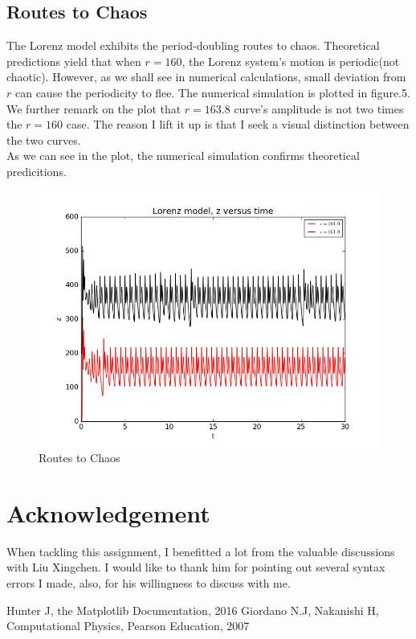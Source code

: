 \documentclass[10pt,a4paper]{article}
\begin{document}
    \subsection{Routes to Chaos}
    The Lorenz model exhibits the period-doubling routes to chaos. Theoretical predictions yield that when $r=160$, the Lorenz system's motion is periodic(not chaotic). However, as we shall see in numerical calculations, small deviation from $r$ can cause the periodicity to flee. The numerical simulation is plotted in figure.5.\\
    We further remark on the plot that $r=163.8$ curve's amplitude is not two times the $r=160$ case. The reason I lift it up is that I seek a visual distinction between the two curves.\\
    As we can see in the plot, the numerical simulation confirms theoretical predicitions.
    \begin{figure}[htbp]
    	\centering
    	\includegraphics[width=5in]{Lorenz_4.png}
    	\caption{Routes to Chaos}
    \end{figure}
    \section*{Acknowledgement}
    When tackling this assignment, I benefitted a lot from the valuable discussions with Liu Xingchen. I would like to thank him for pointing out several syntax errors I made, also, for his willingness to discuss with me.
    
    \begin{thebibliography}{99}
    	\bibitem{}Hunter J, the Matplotlib Documentation, 2016
    	\bibitem{}Giordano N.J, Nakanishi H, Computational Physics, Pearson Education, 2007
    \end{thebibliography} 
\end{document}
